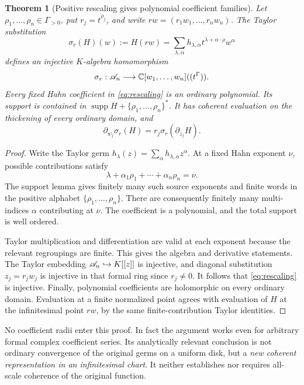 \documentclass[11pt,letterpaper]{article}
\newtheorem{theorem}{Theorem}[section]
\theoremstyle{definition}
\theoremstyle{remark}
\newcommand{\supp}{\operatorname{supp}}\newcommand{\Res}{\operatorname{Res}}
\numberwithin{equation}{section}
\begin{document}
\begin{theorem}[Positive rescaling gives polynomial coefficient families]\label{thm:polynomialization}
Let $\rho_1,\ldots,\rho_n\in\Gamma_{>0}$, put $r_j=t^{\rho_j}$, and write $rw=(r_1w_1,\ldots,r_nw_n)$. The Taylor substitution
\begin{equation}\label{eq:rescaling}
 \sigma_r(H)(w):=H(rw)
 =\sum_{\lambda,\alpha}h_{\lambda,\alpha}
 t^{\lambda+\alpha\cdot\rho}w^\alpha
\end{equation}
defines an injective $K$-algebra homomorphism
\[
 \sigma_r:\mathscr A_n\longrightarrow\mathbb C[w_1,\ldots,w_n]((t^\Gamma)).
\]
Every fixed Hahn coefficient in \eqref{eq:rescaling} is an ordinary polynomial. Its support is contained in $\supp H+\{\rho_1,\ldots,\rho_n\}^*$. It has coherent evaluation on the thickening of every ordinary domain, and
\[
 \partial_{w_j}\sigma_r(H)=r_j\sigma_r(\partial_{z_j}H).
\]
\end{theorem}
\begin{proof}
Write the Taylor germ $h_\lambda(z)=\sum_\alpha h_{\lambda,\alpha}z^\alpha$. At a fixed Hahn exponent $\nu$, possible contributions satisfy
\[
 \lambda+\alpha_1\rho_1+\cdots+\alpha_n\rho_n=\nu.
\]
The support lemma gives finitely many such source exponents and finite words in the positive alphabet $\{\rho_1,\ldots,\rho_n\}$. There are consequently finitely many multi-indices $\alpha$ contributing at $\nu$. The coefficient is a polynomial, and the total support is well ordered.

Taylor multiplication and differentiation are valid at each exponent because the relevant regroupings are finite. This gives the algebra and derivative statements. The Taylor embedding $\mathscr A_n\hookrightarrow K[[z]]$ is injective, and diagonal substitution $z_j=r_jw_j$ is injective in that formal ring since $r_j\ne0$. It follows that \eqref{eq:rescaling} is injective. Finally, polynomial coefficients are holomorphic on every ordinary domain. Evaluation at a finite normalized point agrees with evaluation of $H$ at the infinitesimal point $rw$, by the same finite-contribution Taylor identities.
\end{proof}

No coefficient radii enter this proof. In fact the argument works even for arbitrary formal complex coefficient series. Its analytically relevant conclusion is not ordinary convergence of the original germs on a uniform disk, but a \emph{new coherent representation in an infinitesimal chart}. It neither establishes nor requires all-scale coherence of the original function.
\end{document}
